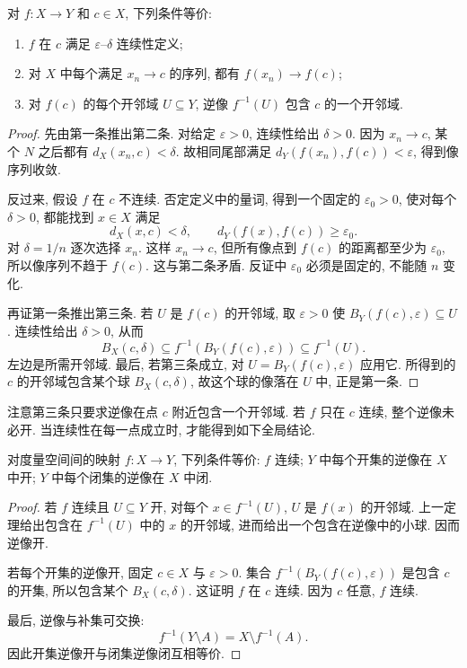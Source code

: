 \begin{theorem}[点处连续的三个判据]\label{ch:seq:continuity-equivalence}
对 $f:X\to Y$ 和 $c\in X$, 下列条件等价:
\begin{enumerate}
 \item $f$ 在 $c$ 满足 $\varepsilon$--$\delta$ 连续性定义;
 \item 对 $X$ 中每个满足 $x_n\to c$ 的序列, 都有 $f(x_n)\to f(c)$;
 \item 对 $f(c)$ 的每个开邻域 $U\subseteq Y$, 逆像 $f^{-1}(U)$ 包含 $c$ 的一个开邻域.
\end{enumerate}
\end{theorem}
\begin{proof}
先由第一条推出第二条. 对给定 $\varepsilon>0$, 连续性给出 $\delta>0$. 因为 $x_n\to c$, 某个 $N$ 之后都有 $d_X(x_n,c)<\delta$. 故相同尾部满足 $d_Y(f(x_n),f(c))<\varepsilon$, 得到像序列收敛.

反过来, 假设 $f$ 在 $c$ 不连续. 否定定义中的量词, 得到一个固定的 $\varepsilon_0>0$, 使对每个 $\delta>0$, 都能找到 $x\in X$ 满足
\[
 d_X(x,c)<\delta,\qquad d_Y(f(x),f(c))\ge\varepsilon_0.
\]
对 $\delta=1/n$ 逐次选择 $x_n$. 这样 $x_n\to c$, 但所有像点到 $f(c)$ 的距离都至少为 $\varepsilon_0$, 所以像序列不趋于 $f(c)$. 这与第二条矛盾. 反证中 $\varepsilon_0$ 必须是固定的, 不能随 $n$ 变化.

再证第一条推出第三条. 若 $U$ 是 $f(c)$ 的开邻域, 取 $\varepsilon>0$ 使 $B_Y(f(c),\varepsilon)\subseteq U$. 连续性给出 $\delta>0$, 从而
\[
 B_X(c,\delta)\subseteq f^{-1}(B_Y(f(c),\varepsilon))
 \subseteq f^{-1}(U).
\]
左边是所需开邻域. 最后, 若第三条成立, 对 $U=B_Y(f(c),\varepsilon)$ 应用它. 所得到的 $c$ 的开邻域包含某个球 $B_X(c,\delta)$, 故这个球的像落在 $U$ 中, 正是第一条.
\end{proof}
注意第三条只要求逆像在点 $c$ 附近包含一个开邻域. 若 $f$ 只在 $c$ 连续, 整个逆像未必开. 当连续性在每一点成立时, 才能得到如下全局结论.

\begin{theorem}[连续映射的逆像判据]\label{ch:seq:preimage}
对度量空间间的映射 $f:X\to Y$, 下列条件等价: $f$ 连续; $Y$ 中每个开集的逆像在 $X$ 中开; $Y$ 中每个闭集的逆像在 $X$ 中闭.
\end{theorem}
\begin{proof}
若 $f$ 连续且 $U\subseteq Y$ 开, 对每个 $x\in f^{-1}(U)$, $U$ 是 $f(x)$ 的开邻域. 上一定理给出包含在 $f^{-1}(U)$ 中的 $x$ 的开邻域, 进而给出一个包含在逆像中的小球. 因而逆像开.

若每个开集的逆像开, 固定 $c\in X$ 与 $\varepsilon>0$. 集合 $f^{-1}(B_Y(f(c),\varepsilon))$ 是包含 $c$ 的开集, 所以包含某个 $B_X(c,\delta)$. 这证明 $f$ 在 $c$ 连续. 因为 $c$ 任意, $f$ 连续.

最后, 逆像与补集可交换:
\[
 f^{-1}(Y\setminus A)=X\setminus f^{-1}(A).
\]
因此开集逆像开与闭集逆像闭互相等价.
\end{proof}


